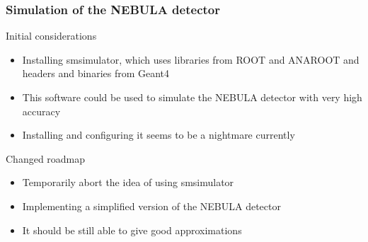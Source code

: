 \begin{frame}
\frametitle{Simulation of the NEBULA detector}

\begin{block}{Initial considerations}
	\begin{itemize}
		\item Installing smsimulator, which uses libraries from ROOT and ANAROOT and headers and binaries from Geant4
		\item This software could be used to simulate the NEBULA detector with very high accuracy
		\item Installing and configuring it seems to be a nightmare currently
	\end{itemize}
\end{block}

\pause

\begin{alertblock}{Changed roadmap}
	\begin{itemize}
		\item Temporarily abort the idea of using smsimulator
		\item Implementing a simplified version of the NEBULA  detector
		\item It should be still able to give good approximations
	\end{itemize}
\end{alertblock}

\end{frame}